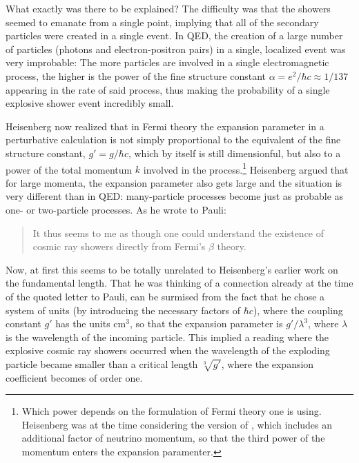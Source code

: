 \documentclass[12pt]{article}
\begin{document}
What exactly was there to be explained? The difficulty was that the showers seemed to emanate from a single point, implying that all of the secondary particles were created in a single event. In QED, the creation of a large number of particles (photons and electron-positron pairs) in a single, localized event was very improbable: The more particles are involved in a single electromagnetic process, the higher is the power of the fine structure constant $\alpha = e^2/\hbar c \approx 1/137$ appearing in the rate of said process, thus making the probability of a single explosive shower event incredibly small. 

Heisenberg now realized that in Fermi theory the expansion parameter in a perturbative calculation is not simply proportional to the equivalent of the fine structure constant, $g' = g/\hbar c$, which by itself is still dimensionful, but  also to a power of the total momentum $k$ involved in the process.\footnote{Which power depends on the formulation of Fermi theory one is using. Heisenberg was at the time considering the version of \cite{konopinski_1935_on-the-fermi}, which includes an additional factor of neutrino momentum, so that the third power of the momentum enters the expansion paramenter.} Heisenberg argued that for large momenta, the expansion parameter also gets large and the situation is very different than in  QED: many-particle processes become just as probable as one- or two-particle processes. As he wrote to Pauli:

\begin{quote}
It thus seems to me as though one could understand the existence of cosmic ray showers directly from Fermi's $\beta$ theory.
\end{quote}

Now, at first this seems to be totally unrelated to Heisenberg's earlier work on the fundamental length. That he was thinking of a connection already at the time of the quoted letter to Pauli, can be surmised from the fact that he chose a system of units (by introducing the necessary factors of $\hbar c$), where the coupling constant $g'$ has the units $\mathrm{cm}^3$, so that the expansion parameter is $g'/\lambda^3$, where $\lambda$ is the wavelength of the incoming particle. This implied a reading where the explosive cosmic ray showers occurred when the wavelength of the exploding particle became smaller than a critical length $\sqrt[3]{g'}$, where the expansion coefficient becomes of order one.
\end{document}

